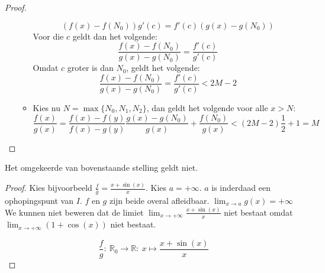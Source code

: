 \documentclass[main.tex]{subfiles}
\begin{document}
\begin{st}
\begin{proof}
\begin{itemize}
\begin{itemize}
        \[ \left( f(x) - f(N_{0}) \right) g'(c) = f'(c) \left( g(x) - g(N_{0}) \right) \]
        Voor die $c$ geldt dan het volgende:
        \[ \frac{f(x)-f(N_{0})}{g(x)-g(N_{0})} = \frac{f'(c)}{g'(c)} \]
        Omdat $c$ groter is dan $N_{0}$, geldt het volgende:
        \[ \frac{f(x)-f(N_{0})}{g(x)-g(N_{0})} = \frac{f'(c)}{g'(c)} < 2M-2 \]
      \item 
        Kies nu $N = \max\{N_{0},N_{1},N_{2}\}$, dan geldt het volgende voor alle $x>N$:
        \[ \frac{f(x)}{g(x)} = \frac{f(x)-f(y)}{f(x)-g(y)}  \frac{g(x)-g(N_{0})}{g(x)} + \frac{f(N_{0})}{g(x)} < (2M-2)\frac{1}{2} + 1 = M \]
      \end{itemize}
    \end{itemize}
  \end{proof}
\end{st}

\begin{tvb}
  Het omgekeerde van bovenstaande stelling geldt niet.
  
  \begin{proof}
    Kies bijvoorbeeld $\frac{f}{g} = \frac{x+\sin(x)}{x}$.
    Kies $a=+\infty$.
    $a$ is inderdaad een ophopingspunt van $I$.
    $f$ en $g$ zijn beide overal afleidbaar.
    $\lim_{x \rightarrow a}g(x) = +\infty$
    We kunnen niet beweren dat de limiet $\lim_{x\rightarrow +\infty}\frac{x+\sin(x)}{x}$ niet bestaat omdat $\lim_{x \rightarrow +\infty}(1+\cos(x))$ niet bestaat.

    \noindent
    \begin{minipage}{.45\textwidth}
    \begin{figure}[H]
      \centering
    \end{figure}
    \end{minipage}
    \begin{minipage}{.45\textwidth}
      \[ \frac{f}{g}:\ \mathbb{R}_{0} \rightarrow \mathbb{R}:\ x \mapsto \frac{x+\sin(x)}{x} \]
    \end{minipage}
  \end{proof}
\end{tvb}
\end{document}
